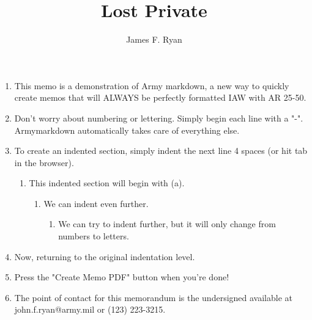 \documentclass{armymemo}
\author{James F. Ryan}\rank{PVT}\branch{IN}
\title{Lost Private}
\begin{document}
\begin{enumerate}
 \item This memo is a demonstration of Army markdown, a new way to quickly create memos that will ALWAYS be perfectly formatted IAW with AR 25-50.
\item Don't worry about numbering or lettering. Simply begin each line with a "-". Armymarkdown automatically takes care of everything else.
\item To create an indented section, simply indent the next line 4 spaces (or hit tab in the browser).

\begin{enumerate}
\item This indented section will begin with (a).
\begin{enumerate}
\item We can indent even further.
\begin{enumerate}
\item We can try to indent further, but it will only change from numbers to letters.
\end{enumerate}
\end{enumerate}
\end{enumerate}
\item Now, returning to the original indentation level.
\item Press the "Create Memo PDF" button when you're done!
\item The point of contact for this memorandum is the undersigned available at john.f.ryan@army.mil or (123) 223-3215.
\end{enumerate}
\end{document}
